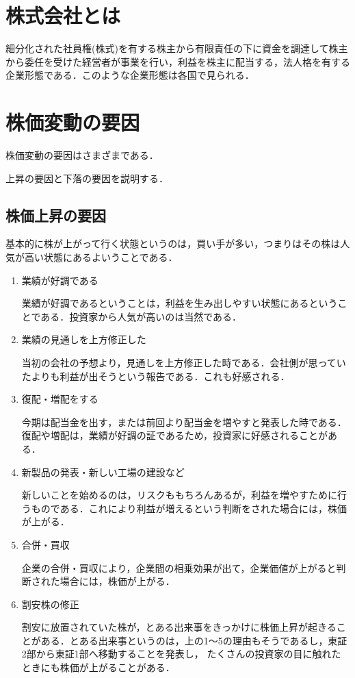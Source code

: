 \section{株式会社とは}
細分化された社員権(株式)を有する株主から有限責任の下に資金を調達して株主から委任を受けた経営者が事業を行い，利益を株主に配当する，法人格を有する企業形態である．このような企業形態は各国で見られる．

\section{株価変動の要因}
株価変動の要因はさまざまである．

上昇の要因と下落の要因を説明する．

\subsection{株価上昇の要因}
基本的に株が上がって行く状態というのは，買い手が多い，つまりはその株は人気が高い状態にあるよいうことである．
\begin{enumerate}
  \item 業績が好調である

業績が好調であるということは，利益を生み出しやすい状態にあるということである．投資家から人気が高いのは当然である．
  \item 業績の見通しを上方修正した

当初の会社の予想より，見通しを上方修正した時である．会社側が思っていたよりも利益が出そうという報告である．これも好感される．
 \item 復配・増配をする

今期は配当金を出す，または前回より配当金を増やすと発表した時である．復配や増配は，業績が好調の証であるため，投資家に好感されることがある．
  \item 新製品の発表・新しい工場の建設など

新しいことを始めるのは，リスクももちろんあるが，利益を増やすために行うものである．これにより利益が増えるという判断をされた場合には，株価が上がる．
  \item 合併・買収

企業の合併・買収により，企業間の相乗効果が出て，企業価値が上がると判断された場合には，株価が上がる．
  \item 割安株の修正

割安に放置されていた株が，とある出来事をきっかけに株価上昇が起きることがある．とある出来事というのは，上の1～5の理由もそうであるし，東証2部から東証1部へ移動することを発表し，
たくさんの投資家の目に触れたときにも株価が上がることがある\cite{kabuup}．
\end{enumerate}


